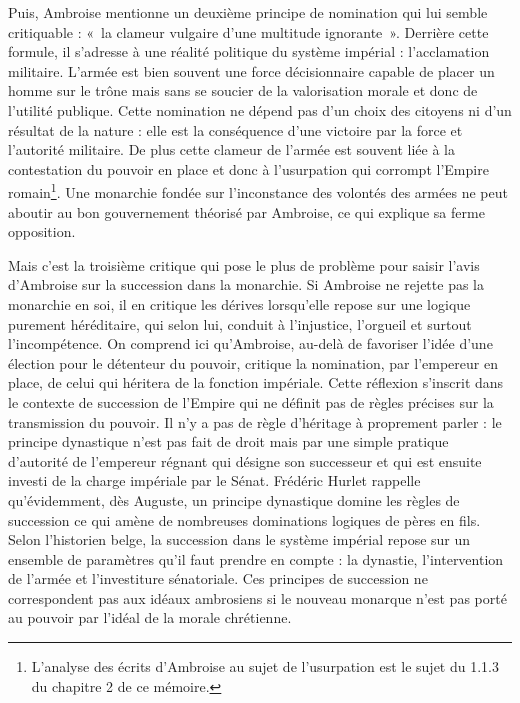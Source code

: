 \bigskip

Puis, Ambroise mentionne un deuxième principe de nomination qui lui semble critiquable : «~la clameur vulgaire d'une multitude ignorante~». Derrière cette formule, il s'adresse à une réalité politique du système impérial : l'acclamation militaire. L'armée est bien souvent une force décisionnaire capable de placer un homme sur le trône mais sans se soucier de la valorisation morale et donc de l'utilité publique. Cette nomination ne dépend pas d'un choix des citoyens ni d'un résultat de la nature : elle est la conséquence d'une victoire par la force et l'autorité militaire. De plus cette clameur de l'armée est souvent liée à la contestation du pouvoir en place et donc à l'usurpation qui corrompt l'Empire romain\footnote{L'analyse des écrits d'Ambroise au sujet de l'usurpation est le sujet du 1.1.3 du chapitre 2 de ce mémoire.}. Une monarchie fondée sur l'inconstance des volontés des armées ne peut aboutir au bon gouvernement théorisé par Ambroise, ce qui explique sa ferme opposition.

\bigskip

Mais c'est la troisième critique qui pose le plus de problème pour saisir l'avis d'Ambroise sur la succession dans la monarchie. Si Ambroise ne rejette pas la monarchie en soi, il en critique les dérives lorsqu’elle repose sur une logique purement héréditaire, qui selon lui, conduit à l'injustice, l'orgueil et surtout l'incompétence. On comprend ici qu’Ambroise, au-delà de favoriser l’idée d’une élection pour le détenteur du pouvoir, critique la nomination, par l'empereur en place, de celui qui héritera de la fonction impériale. Cette réflexion s'inscrit dans le contexte de succession de l’Empire qui ne définit pas de règles précises sur la transmission du pouvoir. Il n’y a pas de règle d’héritage à proprement parler : le principe dynastique n’est pas fait de droit mais par une simple pratique d’autorité de l’empereur régnant qui désigne son successeur et qui est ensuite investi de la charge impériale par le Sénat. Frédéric Hurlet rappelle qu'évidemment, dès Auguste, un principe dynastique domine les règles de succession ce qui amène de nombreuses dominations logiques de pères en fils. Selon l'historien belge, la succession dans le système impérial repose sur un ensemble de paramètres qu'il faut prendre en compte : la dynastie, l'intervention de l'armée et l'investiture sénatoriale\autocite[Chapitre 6 : .]{Hurlet_succession}. Ces principes de succession ne correspondent pas aux idéaux ambrosiens si le nouveau monarque n'est pas porté au pouvoir par l'idéal de la morale chrétienne.


